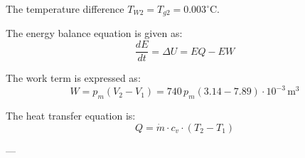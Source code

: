 The temperature difference \( T_{W2} = T_{g2} = 0.003^\circ \text{C} \).  

The energy balance equation is given as:  
\[
\frac{dE}{dt} = \Delta U = EQ - EW
\]  

The work term is expressed as:  
\[
W = p_m (V_2 - V_1) = 740 \, p_m (3.14 - 7.89) \cdot 10^{-3} \, \text{m}^3
\]  

The heat transfer equation is:  
\[
Q = \dot{m} \cdot c_v \cdot (T_2 - T_1)
\]  

---